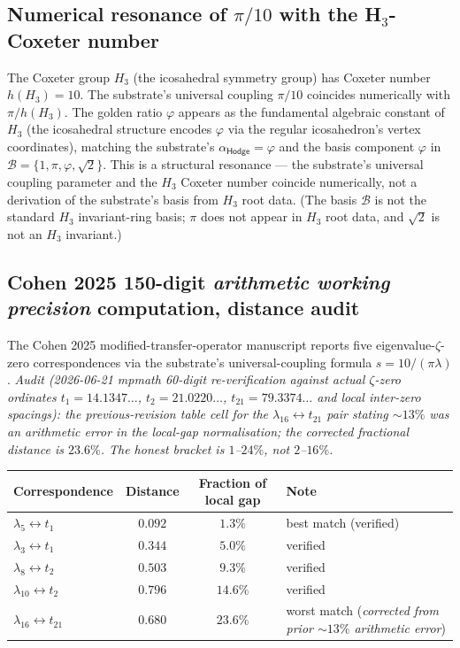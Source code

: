 \documentclass[11pt,a4paper]{amsart}
\theoremstyle{plain}
\theoremstyle{definition}
\begin{document}
\subsection{Numerical resonance of \texorpdfstring{$\pi/10$}{pi/10} with the H\texorpdfstring{$_3$}{3}-Coxeter number}\label{subsec:H3-coxeter-numerical}

The Coxeter group $H_3$ (the icosahedral symmetry group) has Coxeter number $h(H_3) = 10$. The substrate's universal coupling $\pi/10$ coincides numerically with $\pi/h(H_3)$. The golden ratio $\varphi$ appears as the fundamental algebraic constant of $H_3$ (the icosahedral structure encodes $\varphi$ via the regular icosahedron's vertex coordinates), matching the substrate's $\alpha_{\textsf{Hodge}} = \varphi$ and the basis component $\varphi$ in $\mathcal{B} = \{1, \pi, \varphi, \sqrt{2}\}$. This is a structural resonance --- the substrate's universal coupling parameter and the $H_3$ Coxeter number coincide numerically, not a derivation of the substrate's basis from $H_3$ root data. (The basis $\mathcal{B}$ is not the standard $H_3$ invariant-ring basis; $\pi$ does not appear in $H_3$ root data, and $\sqrt{2}$ is not an $H_3$ invariant.)

\subsection{Cohen 2025 150-digit \emph{arithmetic working precision} computation, distance audit}\label{subsec:cohen2025-150digit-audit}

The Cohen 2025 modified-transfer-operator manuscript reports five eigenvalue-$\zeta$-zero correspondences via the substrate's universal-coupling formula $s = 10/(\pi\lambda)$. \emph{Audit (2026-06-21 mpmath 60-digit re-verification against actual $\zeta$-zero ordinates $t_1 = 14.1347\ldots$, $t_2 = 21.0220\ldots$, $t_{21} = 79.3374\ldots$ and local inter-zero spacings): the previous-revision table cell for the $\lambda_{16} \leftrightarrow t_{21}$ pair stating $\sim 13\%$ was an arithmetic error in the local-gap normalisation; the corrected fractional distance is $23.6\%$. The honest bracket is $1$--$24\%$, not $2$--$16\%$.}

\begin{center}
\footnotesize
\begin{tabular}{lccp{4.5cm}}
\toprule
Correspondence & Distance & Fraction of local gap & Note \\
\midrule
$\lambda_5 \leftrightarrow t_1$ & $0.092$ & $1.3\%$ & best match (verified) \\
$\lambda_3 \leftrightarrow t_1$ & $0.344$ & $5.0\%$ & verified \\
$\lambda_8 \leftrightarrow t_2$ & $0.503$ & $9.3\%$ & verified \\
$\lambda_{10} \leftrightarrow t_2$ & $0.796$ & $14.6\%$ & verified \\
$\lambda_{16} \leftrightarrow t_{21}$ & $0.680$ & $\mathbf{23.6\%}$ & worst match (\emph{corrected from prior $\sim 13\%$ arithmetic error}) \\
\bottomrule
\end{tabular}
\end{center}
\end{document}
